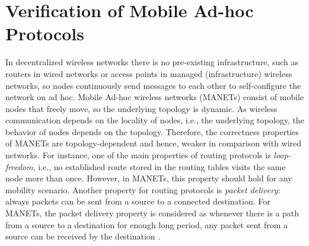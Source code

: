 \section{Verification of Mobile Ad-hoc Protocols}\label{sec::wrebeca} 
In decentralized wireless networks there is no pre-existing infrastructure, such as routers in wired networks or access points in managed (infrastructure) wireless networks, so nodes continuously send messages to each other to self-configure the network on ad hoc. %
Mobile Ad-hoc wireless networks (MANETs) consist of mobile nodes that freely move, so the underlying topology is dynamic. As wireless communication depends on the locality of nodes, i.e., the underlying topology, the behavior of nodes depends on the topology. Therefore, the correctness properties of MANETs are topology-dependent and hence, weaker in comparison with wired networks. For instance, one of the main properties of routing protocols is \emph{loop-freedom}, i.e., no established route stored in the routing tables visits the same node more than once. 
However, in MANETs, this property should hold for any mobility scenario. Another property for routing protocols is \emph{packet delivery}: always packets can be sent from a source to a connected destination. For MANETs, the packet delivery property is considered as whenever there is a path from a source to a destination for enough long period, any packet sent from a source can be received by the destination \cite{GlabbeekAWN}.

